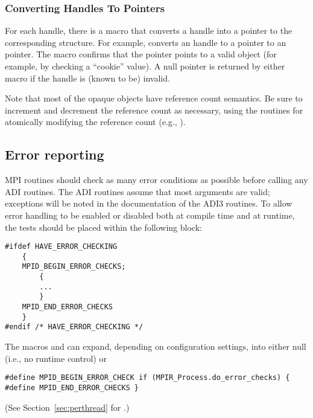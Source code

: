 \documentclass{article}
\begin{document}
\subsubsection{Converting Handles To Pointers}
\label{sec:handle-to-ptr}
For each handle, there is a macro  that converts a
handle into a pointer to the corresponding structure.  For example,
 converts an  handle to a pointer to an
 pointer.  The macro  confirms
that the pointer points to a valid object (for example, by checking a
``cookie'' value).  A null pointer is returned by either macro if the handle
is (known to be) invalid.

Note that most of the opaque objects have reference count semantics.
Be sure to increment and decrement the reference count as necessary,
using the routines for atomically modifying the reference count (e.g.,
). 

\subsection{Error reporting}
\label{sec:error-reporting}

MPI routines should check as many error conditions as possible before
calling any ADI routines.  The ADI routines assume that most arguments are
valid; exceptions will be noted in the documentation of the ADI3 routines.
To allow error handling to be enabled or disabled both at compile
time 
and at runtime, the tests should be placed within the following block:
\begin{verbatim}
#ifdef HAVE_ERROR_CHECKING
    {
    MPID_BEGIN_ERROR_CHECKS;
        {
        ...
        }
    MPID_END_ERROR_CHECKS
    }
#endif /* HAVE_ERROR_CHECKING */
\end{verbatim}
The macros  and  can
expand, depending on configuration settings, into either null (i.e.,
no runtime control) or 
\begin{verbatim}
#define MPID_BEGIN_ERROR_CHECK if (MPIR_Process.do_error_checks) {
#define MPID_END_ERROR_CHECKS }
\end{verbatim}
(See Section~\ref{sec:perthread} for .)
\end{document}
